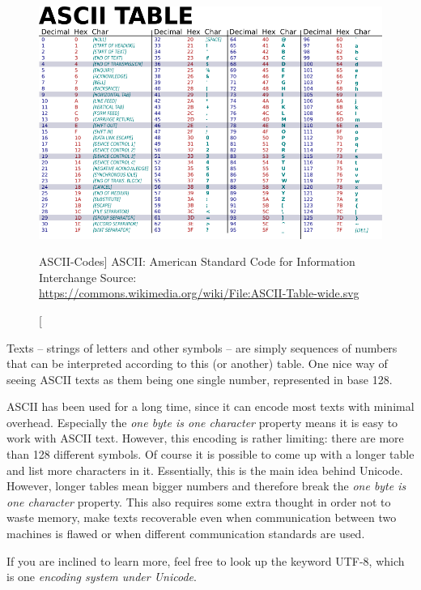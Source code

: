 \begin{figure}
\includegraphics[width=\linewidth]{./gfx/ASCII_table}\newline
\caption
	[ASCII-Codes]
	{ASCII: American Standard Code for Information Interchange\newline
         Source: \url{https://commons.wikimedia.org/wiki/File:ASCII-Table-wide.svg}
    }
\label{fig:ASCII}
\end{figure}

Texts -- \ie strings of letters and other symbols -- are simply sequences of numbers that can be interpreted according to this (or another) table. One nice way of seeing ASCII texts as them being one single number, represented in base 128.

\begin{plusbox}
ASCII has been used for a long time, since it can encode most texts with minimal overhead. Especially the \emph{one byte is one character} property means it is easy to work with ASCII text. However, this encoding is rather limiting: there are more than 128 different symbols. Of course it is possible to come up with a longer table and list more characters in it. Essentially, this is the main idea behind Unicode. However, longer tables mean bigger numbers and therefore break the \emph{one byte is one character} property. This also requires some extra thought in order not to waste memory, make texts recoverable even when communication between two machines is flawed or when different communication standards are used.

If you are inclined to learn more, feel free to look up the keyword UTF-8, which is one \emph{encoding system under Unicode}.
\end{plusbox}

